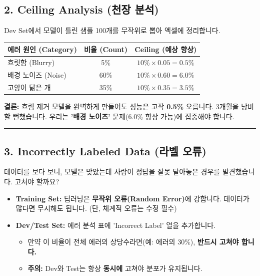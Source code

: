 \documentclass[11pt,a4paper]{book}
\theoremstyle{definition}
\begin{document}
\subsection{2. Ceiling Analysis (천장 분석)}
Dev Set에서 모델이 틀린 샘플 100개를 무작위로 뽑아 엑셀에 정리합니다.


\begin{strategybox}[title={분석 결과 시뮬레이션}]
\begin{center}
\begin{tabular}{l|c|c}
\hline
\textbf{에러 원인 (Category)} & \textbf{비율 (Count)} & \textbf{Ceiling (예상 향상)} \\ \hline
흐릿함 (Blurry) & 5\% & $10\% \times 0.05 = \mathbf{0.5\%}$ \\ \hline
배경 노이즈 (Noise) & 60\% & $10\% \times 0.60 = \mathbf{6.0\%}$ \\ \hline
고양이 닮은 개 & 35\% & $10\% \times 0.35 = \mathbf{3.5\%}$ \\ \hline
\end{tabular}
\end{center}
\textbf{결론:} 흐림 제거 모델을 완벽하게 만들어도 성능은 고작 \textbf{0.5\%} 오릅니다. 3개월을 낭비할 뻔했습니다. 우리는 \textbf{'배경 노이즈'} 문제(6.0\% 향상 가능)에 집중해야 합니다.
\end{strategybox}

\vspace{0.5cm}\hrule\vspace{0.5cm}

\subsection{3. Incorrectly Labeled Data (라벨 오류)}
데이터를 보다 보니, 모델은 맞았는데 사람이 정답을 잘못 달아놓은 경우를 발견했습니다. 고쳐야 할까요?

\begin{itemize}
    \item \textbf{Training Set:} 딥러닝은 \textbf{무작위 오류(Random Error)}에 강합니다. 데이터가 많다면 무시해도 됩니다. (단, 체계적 오류는 수정 필수)
    \item \textbf{Dev/Test Set:} 에러 분석 표에 'Incorrect Label' 열을 추가합니다.
    \begin{itemize}
        \item 만약 이 비율이 전체 에러의 상당수라면(예: 에러의 30\%), \textbf{반드시 고쳐야 합니다.}
        \item \textbf{주의:} Dev와 Test는 항상 \textbf{동시에} 고쳐야 분포가 유지됩니다.
    \end{itemize}
\end{itemize}
\end{document}
